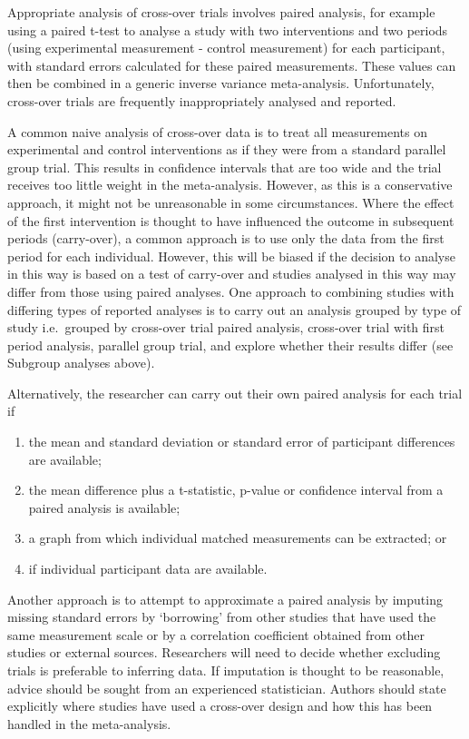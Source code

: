 \documentclass[
  11pt,
  a4paper,
  DIV=11,
  numbers=noendperiod]{scrreprt}
\begin{document}
Appropriate analysis of cross-over trials involves paired analysis, for
example using a paired t-test to analyse a study with two interventions
and two periods (using experimental measurement - control measurement)
for each participant, with standard errors calculated for these paired
measurements. These values can then be combined in a generic inverse
variance meta-analysis. Unfortunately, cross-over trials are frequently
inappropriately analysed and reported.

A common naive analysis of cross-over data is to treat all measurements
on experimental and control interventions as if they were from a
standard parallel group trial. This results in confidence intervals that
are too wide and the trial receives too little weight in the
meta-analysis. However, as this is a conservative approach, it might not
be unreasonable in some circumstances. Where the effect of the first
intervention is thought to have influenced the outcome in subsequent
periods (carry-over), a common approach is to use only the data from the
first period for each individual. However, this will be biased if the
decision to analyse in this way is based on a test of carry-over and
studies analysed in this way may differ from those using paired
analyses. One approach to combining studies with differing types of
reported analyses is to carry out an analysis grouped by type of study
i.e.~grouped by cross-over trial paired analysis, cross-over trial with
first period analysis, parallel group trial, and explore whether their
results differ (see Subgroup analyses above).

Alternatively, the researcher can carry out their own paired analysis
for each trial if

\begin{enumerate}
\def\labelenumi{\arabic{enumi}.}
\item
  the mean and standard deviation or standard error of participant
  differences are available;
\item
  the mean difference plus a t-statistic, p-value or confidence interval
  from a paired analysis is available;
\item
  a graph from which individual matched measurements can be extracted;
  or
\item
  if individual participant data are available.
\end{enumerate}

Another approach is to attempt to approximate a paired analysis by
imputing missing standard errors by `borrowing' from other studies that
have used the same measurement scale or by a correlation coefficient
obtained from other studies or external sources. Researchers will need
to decide whether excluding trials is preferable to inferring data. If
imputation is thought to be reasonable, advice should be sought from an
experienced statistician. Authors should state explicitly where studies
have used a cross-over design and how this has been handled in the
meta-analysis.
\end{document}
